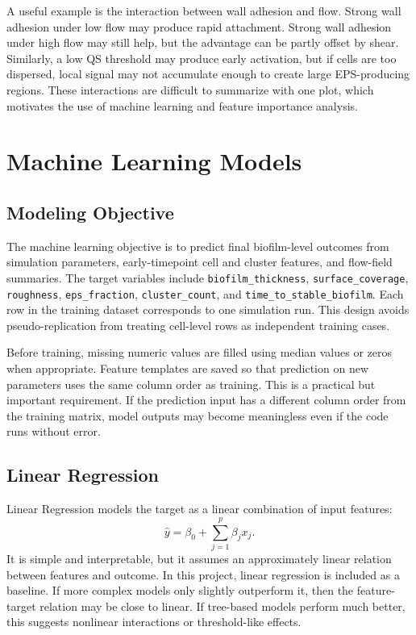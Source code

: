 \documentclass[12pt,a4paper,oneside]{report}
\begin{document}
A useful example is the interaction between wall adhesion and flow. Strong wall adhesion under low flow may produce rapid attachment. Strong wall adhesion under high flow may still help, but the advantage can be partly offset by shear. Similarly, a low QS threshold may produce early activation, but if cells are too dispersed, local signal may not accumulate enough to create large EPS-producing regions. These interactions are difficult to summarize with one plot, which motivates the use of machine learning and feature importance analysis.

\chapter{Machine Learning Models}

\section{Modeling Objective}
The machine learning objective is to predict final biofilm-level outcomes from simulation parameters, early-timepoint cell and cluster features, and flow-field summaries. The target variables include \texttt{biofilm\_thickness}, \texttt{surface\_coverage}, \texttt{roughness}, \texttt{eps\_fraction}, \texttt{cluster\_count}, and \texttt{time\_to\_stable\_biofilm}. Each row in the training dataset corresponds to one simulation run. This design avoids pseudo-replication from treating cell-level rows as independent training cases.

Before training, missing numeric values are filled using median values or zeros when appropriate. Feature templates are saved so that prediction on new parameters uses the same column order as training. This is a practical but important requirement. If the prediction input has a different column order from the training matrix, model outputs may become meaningless even if the code runs without error.

\section{Linear Regression}
Linear Regression models the target as a linear combination of input features:
\begin{equation}
\hat{y}=\beta_0+\sum_{j=1}^{p}\beta_j x_j.
\end{equation}
It is simple and interpretable, but it assumes an approximately linear relation between features and outcome. In this project, linear regression is included as a baseline. If more complex models only slightly outperform it, then the feature-target relation may be close to linear. If tree-based models perform much better, this suggests nonlinear interactions or threshold-like effects.
\end{document}
